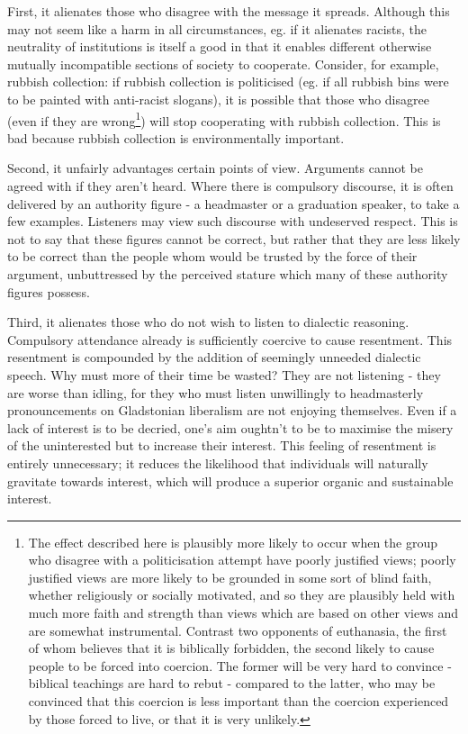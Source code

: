 \documentclass[12pt,a4paper]{report}
\begin{document}
\begin{multicols}{2}
First, it alienates those who disagree with the message it spreads.
Although this may not seem like a harm in all circumstances, eg. if it
alienates racists, the neutrality of institutions is itself a good in
that it enables different otherwise mutually incompatible sections of
society to cooperate. Consider, for example, rubbish collection: if
rubbish collection is politicised (eg. if all rubbish bins were to be
painted with anti-racist slogans), it is possible that those who
disagree (even if they are wrong\footnote{The effect described here is
	plausibly more likely to occur when the group who disagree with a
	politicisation attempt have poorly justified views; poorly justified
	views are more likely to be grounded in some sort of blind faith,
	whether religiously or socially motivated, and so they are plausibly
	held with much more faith and strength than views which are based on
	other views and are somewhat instrumental. Contrast two opponents of
	euthanasia, the first of whom believes that it is biblically
	forbidden, the second likely to cause people to be forced into
	coercion. The former will be very hard to convince - biblical
	teachings are hard to rebut - compared to the latter, who may be
	convinced that this coercion is less important than the coercion
	experienced by those forced to live, or that it is very unlikely.})
will stop cooperating with rubbish collection. This is bad because
rubbish collection is environmentally important.

Second, it unfairly advantages certain points of view. Arguments cannot
be agreed with if they aren't heard. Where there is compulsory
discourse, it is often delivered by an authority figure - a headmaster
or a graduation speaker, to take a few examples. Listeners may view such
discourse with undeserved respect. This is not to say that these figures
cannot be correct, but rather that they are less likely to be correct
than the people whom would be trusted by the force of their argument,
unbuttressed by the perceived stature which many of these authority
figures possess.

Third, it alienates those who do not wish to listen to dialectic
reasoning. Compulsory attendance already is sufficiently coercive to
cause resentment. This resentment is compounded by the addition of
seemingly unneeded dialectic speech. Why must more of their time be
wasted? They are not listening - they are worse than idling, for they
who must listen unwillingly to headmasterly pronouncements on
Gladstonian liberalism are not enjoying themselves. Even if a lack of
interest is to be decried, one's aim oughtn't to be to maximise the
misery of the uninterested but to increase their interest. This feeling
of resentment is entirely unnecessary; it reduces the likelihood that
individuals will naturally gravitate towards interest, which will
produce a superior organic and sustainable interest.


\end{multicols}
\end{document}
